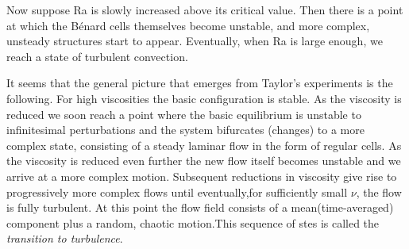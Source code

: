 Now suppose Ra is slowly increased above its critical value. Then
there is a point at which the B\'{e}nard cells themselves become unstable,
and more complex, unsteady structures start to appear.
Eventually, when Ra is large enough, we reach a state of turbulent convection.
 
It seems that the general picture that emerges from Taylor’s experiments is
the following. For high viscosities the basic configuration is stable. As the viscosity is reduced we
soon reach a point where the basic equilibrium is unstable to infinitesimal perturbations and the
system bifurcates (changes) to a more complex state, consisting of a steady laminar flow in the
form of regular cells. As the viscosity is reduced even further the new flow itself becomes unstable
and we arrive at a more complex motion. Subsequent reductions in viscosity give rise to
progressively more complex flows until eventually,for sufficiently small $\nu$, the flow is fully turbulent.
At this point the flow field consists of a mean(time-averaged) component plus a random, chaotic
motion.This sequence of stes is called the {\it transition to turbulence}.


